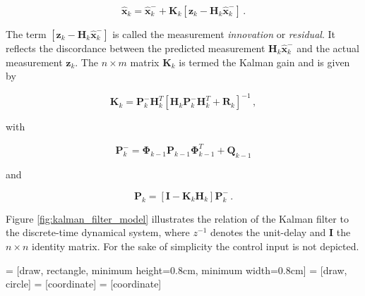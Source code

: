 \begin{equation}\label{eq:aposteriori_estimate}
  \hat{\mathbf{x}}_k = \hat{\mathbf{x}}^-_k + \mathbf{K}_{k}[\mathbf{z}_k-\mathbf{H}_{k}\hat{\mathbf{x}}^-_k]\,.
\end{equation}

\noindent
The term $[\mathbf{z}_k-\mathbf{H}_{k}\hat{\mathbf{x}}^-_k]$ is called the measurement \emph{innovation} or \emph{residual}. It reflects the discordance between the predicted measurement $\mathbf{H}_{k}\hat{\mathbf{x}}^-_k$ and the actual measurement $\mathbf{z}_k$. The $n\times m$ matrix $\mathbf{K}_{k}$ is termed the Kalman gain and is given by

\begin{equation}\label{eq:Kalman_gain}
  \mathbf{K}_{k} = \mathbf{P}^-_k \mathbf{H}^T_k[\mathbf{H}_k \mathbf{P}^-_k \mathbf{H}^T_k + \mathbf{R}_k]^{-1}\,,
\end{equation}

\noindent
with

\begin{equation}\label{eq:apriori_error_cov}
  \mathbf{P}^-_{k} = \bm{\Phi}_{k-1} \mathbf{P}_{k-1} \bm{\Phi}^T_{k-1} + \mathbf{Q}_{k-1}
\end{equation}

\noindent
and

\begin{equation}\label{eq:aposteriori_error_cov}
  \mathbf{P}_{k} = [\mathbf{I} - \mathbf{K}_{k}\mathbf{H}_{k}]\mathbf{P}^-_{k}\,.
\end{equation}

\noindent
Figure \ref{fig:kalman_filter_model} illustrates the relation of the Kalman filter to the discrete-time dynamical system, where $z^{-1}$ denotes the unit-delay and $\mathbf{I}$ the $n\times n$ identity matrix. For the sake of simplicity the control input is not depicted.

 = [draw, rectangle, minimum height=0.8cm, minimum width=0.8cm]
 = [draw, circle]
 = [coordinate]
 = [coordinate]

